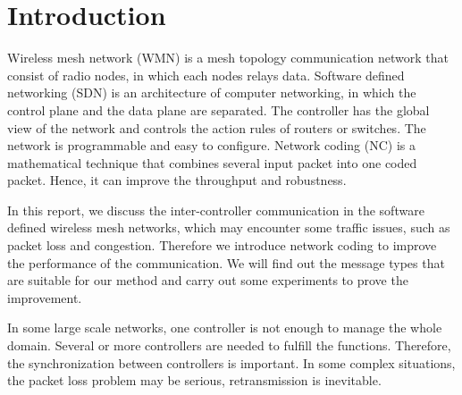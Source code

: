 \documentclass[10pt,conference,final]{IEEEtran}
\newcommand{\Hide}[1]{%
	{ 
		\parindent0pt
		\emph{\scriptsize #1}
	}
}
\begin{document}
	\maketitle
	
	
	\section{Introduction}
	
	
	Wireless mesh network (WMN) is a mesh topology communication network that consist of radio nodes, in which each nodes relays data. Software defined networking (SDN) is an architecture of computer networking, in which the control plane and the data plane are separated. The controller has the global view of the network and controls the action rules of routers or switches. The network is programmable and easy to configure. Network coding (NC) is a mathematical technique that combines several input packet into one coded packet. Hence, it can improve the throughput and robustness.
	
	In this report, we discuss the inter-controller communication in the software defined wireless mesh networks, which may encounter some traffic issues, such as packet loss and congestion. Therefore we introduce network coding to improve the performance of the communication. We will find out the message types that are suitable for our method and carry out some experiments to prove the improvement.
	
	
	
	
	
	
	In some large scale networks, one controller is not enough to manage the whole domain. Several or more controllers are needed to fulfill the functions. Therefore, the synchronization between controllers is important. In some complex situations, the packet loss problem may be serious, retransmission is inevitable.
	
\end{document}
